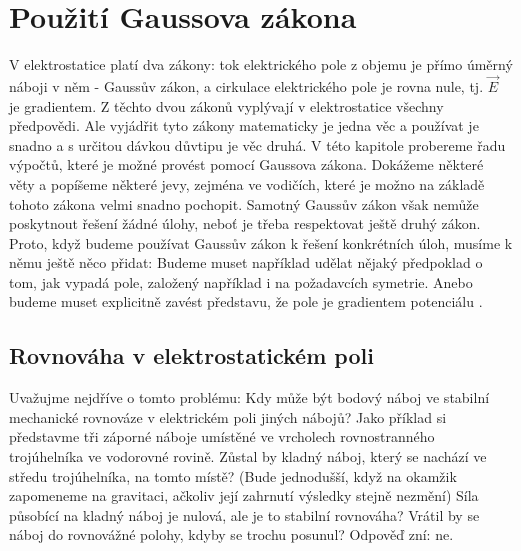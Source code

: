 \setchaptertoc
\chapter{Použití Gaussova zákona}\label{fyz:IIchapV}

V elektrostatice platí dva zákony: tok elektrického pole z objemu je přímo úměrný náboji v něm -
Gaussův zákon, a cirkulace elektrického pole je rovna nule, tj. \(\vec{E}\) je gradientem. Z těchto
dvou zákonů vyplývají v elektrostatice všechny předpovědi. Ale vyjádřit tyto zákony matematicky je
jedna věc a používat je snadno a s určitou dávkou důvtipu je věc druhá. V této kapitole probereme
řadu výpočtů, které je možné provést pomocí Gaussova zákona. Dokážeme některé věty a popíšeme
některé jevy, zejména ve vodičích, které je možno na základě tohoto zákona velmi snadno pochopit.
Samotný Gaussův zákon však nemůže poskytnout řešení žádné úlohy, neboť je třeba respektovat ještě
druhý zákon. Proto, když budeme používat Gaussův zákon k řešení konkrétních úloh, musíme k němu
ještě něco přidat: Budeme muset například udělat nějaký předpoklad o tom, jak vypadá pole, založený
například i na požadavcích symetrie. Anebo budeme muset explicitně zavést představu, že pole je
gradientem potenciálu \cite[s.~82]{Feynman02}.

\section{Rovnováha v elektrostatickém poli}\label{fyz:IIchapVsecI}
  Uvažujme nejdříve o tomto problému: Kdy může být bodový náboj ve stabilní mechanické rovnováze v
  elektrickém poli jiných nábojů? Jako příklad si představme tři záporné náboje umístěné ve
  vrcholech rovnostranného trojúhelníka ve vodorovné rovině. Zůstal by kladný náboj, který se
  nachází ve středu trojúhelníka, na tomto místě? (Bude jednodušší, když na okamžik zapomeneme na
  gravitaci, ačkoliv její zahrnutí výsledky stejně nezmění) Síla působící na kladný náboj je nulová,
  ale je to stabilní rovnováha? Vrátil by se náboj do rovnovážné polohy, kdyby se trochu posunul?
  Odpověď zní: ne.
  
